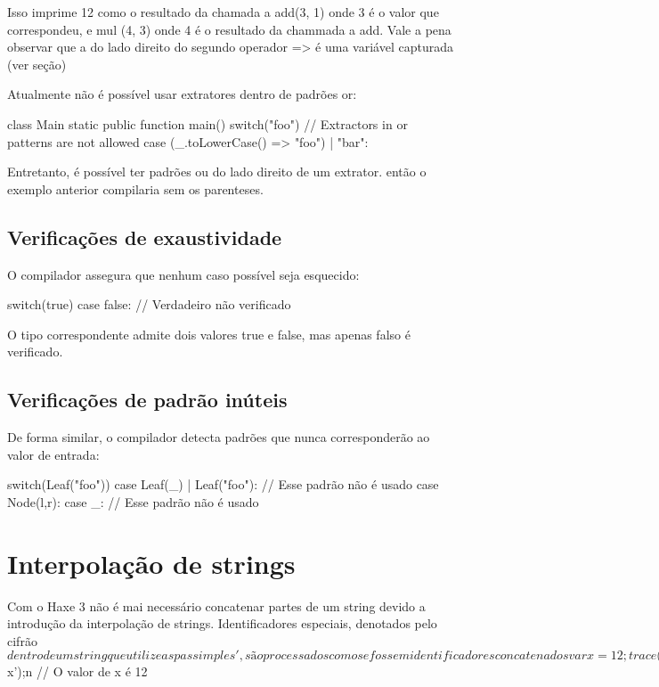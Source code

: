 {Isso imprime 12 como o resultado da chamada a add(3, 1) onde 3 é o valor que correspondeu, e mul (4, 3) onde 4 é o resultado da chammada a add. Vale a pena observar que a do lado direito do segundo operador => é uma variável capturada (ver seção)

Atualmente não é possível usar extratores dentro de padrões or:

class Main {
    static public function main() {
        switch("foo") {
            // Extractors in or patterns are not allowed
            case (_.toLowerCase() => "foo") | "bar":
        }
    }
}

Entretanto, é possível ter padrões ou do lado direito de um extrator. então o exemplo anterior compilaria sem os parenteses.

\subsection{Verificações de exaustividade}

O compilador assegura que nenhum caso possível seja esquecido:

switch(true) {
    case false:
} // Verdadeiro não verificado

O tipo correspondente admite dois valores true e false, mas apenas falso é verificado.

\subsection{Verificações de padrão inúteis}

De forma similar, o compilador detecta padrões que nunca corresponderão ao valor de entrada:

switch(Leaf("foo")) {
    case Leaf(_) 
    | Leaf("foo"): // Esse padrão não é usado
    case Node(l,r):
    case _: // Esse padrão não é usado
}

\section {Interpolação de strings}

Com o Haxe 3 não é mai necessário concatenar partes de um string devido a introdução da interpolação de strings. Identificadores especiais, denotados pelo cifrão $ dentro de um string que utilize aspas simples ', são processados como se fossem identificadores concatenados

var x = 12;
trace(’O valor de x é $x’);n // O valor de x é 12

}
